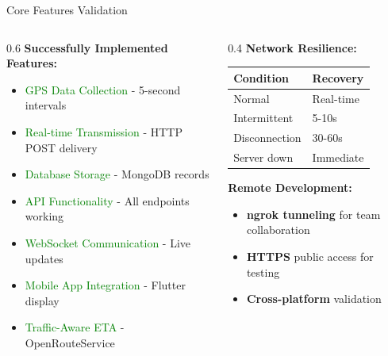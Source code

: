 \documentclass[aspectratio=169]{beamer}
\begin{document}
\begin{frame}{Core Features Validation}
    \begin{columns}
        \begin{column}{0.6\textwidth}
            \textbf{Successfully Implemented Features:}
            \begin{itemize}
                \item[$\checkmark$] \textcolor{green}{GPS Data Collection} - 5-second intervals
                \item[$\checkmark$] \textcolor{green}{Real-time Transmission} - HTTP POST delivery
                \item[$\checkmark$] \textcolor{green}{Database Storage} - MongoDB records
                \item[$\checkmark$] \textcolor{green}{API Functionality} - All endpoints working
                \item[$\checkmark$] \textcolor{green}{WebSocket Communication} - Live updates
                \item[$\checkmark$] \textcolor{green}{Mobile App Integration} - Flutter display
                \item[$\checkmark$] \textcolor{green}{Traffic-Aware ETA} - OpenRouteService
            \end{itemize}
        \end{column}
        \begin{column}{0.4\textwidth}
            \textbf{Network Resilience:}
            \begin{center}
                \footnotesize
                \begin{tabular}{|l|l|}
                    \hline
                    \textbf{Condition} & \textbf{Recovery} \\
                    \hline
                    Normal & Real-time \\
                    Intermittent & 5-10s \\
                    Disconnection & 30-60s \\
                    Server down & Immediate \\
                    \hline
                \end{tabular}
            \end{center}
            
            \vspace{0.3cm}
            \textbf{Remote Development:}
            \begin{itemize}
                \item \textbf{ngrok tunneling} for team collaboration
                \item \textbf{HTTPS} public access for testing
                \item \textbf{Cross-platform} validation
            \end{itemize}
        \end{column}
    \end{columns}
\end{frame}
\end{document}
